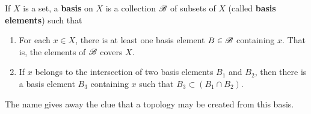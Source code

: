   \begin{definition}[Basis] 
    \label{def:basis}
    If $X$ is a set, a \textbf{basis} on $X$ is a collection $\B$ of subsets of $X$ (called \textbf{basis elements}) such that
    \begin{enumerate}
      \item For each $x \in X$, there is at least one basis element $B \in \B$ containing $x$. That is, the elements of $\B$ covers $X$. 
      \item If $x$ belongs to the intersection of two basis elements $B_1$ and $B_2$, then there is a basis element $B_3$ containing $x$ such that $B_3 \subset (B_1 \cap B_2)$. 
    \end{enumerate}
  \end{definition} 

  The name gives away the clue that a topology may be created from this basis.  

